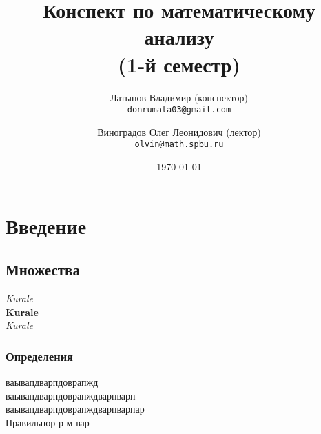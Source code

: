 \documentclass[12pt, a4paper]{article}
\title{Конспект по математическому анализу \\(1-й семестр)}
\author{
  Латыпов Владимир (конспектор)\\
  \texttt{donrumata03@gmail.com}
  \and
  Виноградов Олег Леонидович (лектор)\\
  \texttt{olvin@math.spbu.ru}
}
\date{\today}
\begin{document}
     \maketitle
     \newpage
     \tableofcontents
     \newpage
    

    \section{Введение}
    
    \subsection{Множества}
    
    \textit{Kurale}\\
    \textbf{Kurale}\\
    \textsl{Kurale}\\


    \subsubsection{Определения}
    
    \begin{theorem}
        
        ваывапдварпдоврапжд \\
        ваывапдварпдоврапждварпварп \\
        ваывапдварпдоврапждварпварпар \\
        Правильнор
        р
        м
        вар
    \end{theorem}
\end{document}

